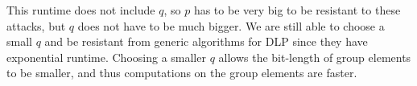 \begin{enumerate}[label=(\alph*)]
\begin{enumerate}[label=(\roman*)]
            This runtime does not include $q$, so $p$ has to be very big to be resistant to these attacks, but $q$ does not have to be much bigger. We are still able to choose a small $q$ and be resistant from generic algorithms for DLP since they have exponential runtime. Choosing a smaller $q$ allows the bit-length of group elements to be smaller, and thus computations on the group elements are faster.

            
        \end{enumerate}



        
    \end{enumerate}

